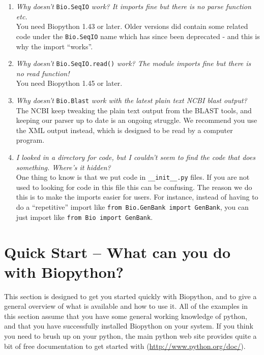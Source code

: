 \documentclass{report}
\begin{document}
\begin{enumerate}

  \item \emph{Why doesn't} \verb|Bio.SeqIO| \emph{work? It imports fine but there is no parse function etc.} \\
  You need Biopython 1.43 or later.  Older versions did contain some related code under the \verb|Bio.SeqIO| name which has since been deprecated - and this is why the import ``works''.

  \item \emph{Why doesn't} \verb|Bio.SeqIO.read()| \emph{work? The module imports fine but there is no read function!} \\
  You need Biopython 1.45 or later.

  \item \emph{Why doesn't} \verb|Bio.Blast| \emph{work with the latest plain text NCBI blast output?} \\
  The NCBI keep tweaking the plain text output from the BLAST tools, and keeping our parser up to date is an ongoing struggle.  We recommend you use the XML output instead, which is designed to be read by a computer program.

  \item \emph{I looked in a directory for code, but I couldn't seem to find the code that does something. Where's it hidden?} \\
  One thing to know is that we put code in \verb|__init__.py| files. If you are not used to looking for code in this file this can be confusing. The reason we do this is to make the imports easier for users. For instance, instead of having to do a ``repetitive'' import like \verb|from Bio.GenBank import GenBank|, you can just import like \verb|from Bio import GenBank|.

\end{enumerate}

\chapter{Quick Start -- What can you do with Biopython?}
\label{chapter:quick-start}

This section is designed to get you started quickly with Biopython, and to give a general overview of what is available and how to use it. All of the examples in this section assume that you have some general working knowledge of python, and that you have successfully installed Biopython on your system. If you think you need to brush up on your python, the main python web site provides quite a bit of free documentation to get started with (\url{http://www.python.org/doc/}).
\end{document}
